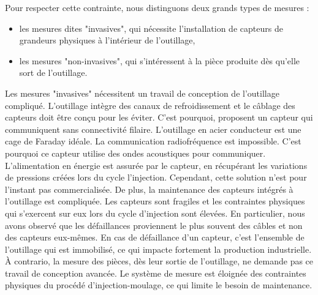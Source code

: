 Pour respecter cette contrainte, nous distinguons deux grands types de mesures :
\begin{itemize}
\item les mesures dites "invasives", qui nécessite l'installation de capteurs de grandeurs physiques à l'intérieur de l'outillage,
\item les mesures "non-invasives", qui s'intéressent à la pièce produite dès qu'elle sort de l'outillage.
\end{itemize}


Les mesures "invasives" nécessitent un travail de conception de l'outillage compliqué.
L'outillage intègre des canaux de refroidissement et le câblage des capteurs doit être conçu pour les éviter.
C'est pourquoi, \cite{kazmer_feasibility_2011, gao_multivariate_2012} proposent un capteur qui communiquent sans connectivité filaire.
L'outillage en acier conducteur est une cage de Faraday idéale.
La communication radiofréquence  est impossible.
C'est pourquoi ce capteur utilise des ondes acoustiques pour communiquer.
L'alimentation en énergie est assurée par le capteur, en récupérant les variations de pressions créées lors du cycle l'injection.
Cependant, cette solution n'est pour l'instant pas commercialisée.
De plus, la maintenance des capteurs intégrés à l'outillage est compliquée.
Les capteurs sont fragiles et les contraintes physiques qui s'exercent sur eux lors du cycle d'injection sont élevées.
En particulier, nous avons observé que les défaillances proviennent le plus souvent des câbles et non des capteurs eux-mêmes.
En cas de défaillance d'un capteur, c'est l'ensemble de l'outillage qui est immobilisé, ce qui impacte fortement la production industrielle.
À contrario, la mesure des pièces, dès leur sortie de l'outillage, ne demande pas ce travail de conception avancée.
Le système de mesure est éloignée des contraintes physiques du procédé d'injection-moulage, ce qui limite le besoin de maintenance.

